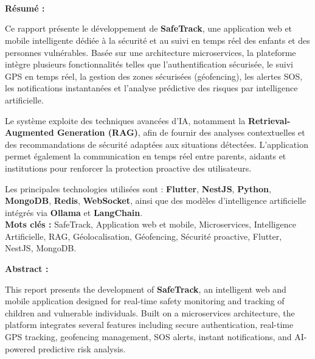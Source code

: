 ﻿﻿\chapter*{}

\begin{center}
\textbf{\large Résumé : }
\end{center}

Ce rapport présente le développement de \textbf{SafeTrack}, une application web et mobile intelligente dédiée à la sécurité et au suivi en temps réel des enfants et des personnes vulnérables. Basée sur une architecture microservices, la plateforme intègre plusieurs fonctionnalités telles que l’authentification sécurisée, le suivi GPS en temps réel, la gestion des zones sécurisées (géofencing), les alertes SOS, les notifications instantanées et l’analyse prédictive des risques par intelligence artificielle. 

Le système exploite des techniques avancées d’IA, notamment la \textbf{Retrieval-Augmented Generation (RAG)}, afin de fournir des analyses contextuelles et des recommandations de sécurité adaptées aux situations détectées. L’application permet également la communication en temps réel entre parents, aidants et institutions pour renforcer la protection proactive des utilisateurs.

Les principales technologies utilisées sont : \textbf{Flutter}, \textbf{NestJS}, \textbf{Python}, \textbf{MongoDB}, \textbf{Redis}, \textbf{WebSocket}, ainsi que des modèles d’intelligence artificielle intégrés via \textbf{Ollama} et \textbf{LangChain}.\\

\noindent
\textbf{Mots clés :} SafeTrack, Application web et mobile, Microservices, Intelligence Artificielle, RAG, Géolocalisation, Géofencing, Sécurité proactive, Flutter, NestJS, MongoDB.

\vspace{1em}

\begin{center}
\textbf{\large Abstract : }
\end{center}

This report presents the development of \textbf{SafeTrack}, an intelligent web and mobile application designed for real-time safety monitoring and tracking of children and vulnerable individuals. Built on a microservices architecture, the platform integrates several features including secure authentication, real-time GPS tracking, geofencing management, SOS alerts, instant notifications, and AI-powered predictive risk analysis.

